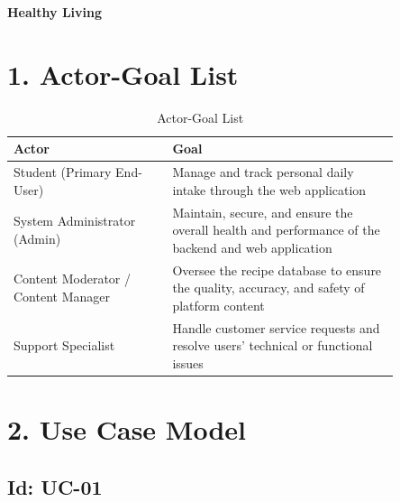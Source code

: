 \documentclass[10pt,letterpaper]{article}
\newcommand{\indexterms}[1]{{\fontsize{9}{11}\selectfont \textbf{Index Terms---} #1\par}}
\begin{document}
\begin{center}
{\fontsize{24}{28}\selectfont \textbf{Healthy Living}}
\end{center}
\vspace{0.5em}


\section*{1. Actor-Goal List}

\begin{table}[h!]
\centering
\caption{Actor-Goal List}
\label{tab:actor-goal-list}
\begin{tabular}{|p{0.35\linewidth}|p{0.5\linewidth}|}
\hline
\textbf{Actor} & \textbf{Goal} \\
\hline
Student (Primary End-User) & Manage and track personal daily intake through the web application \\
\hline
System Administrator (Admin) & Maintain, secure, and ensure the overall health and performance of the backend and web application \\
\hline
Content Moderator / Content Manager & Oversee the recipe database to ensure the quality, accuracy, and safety of platform content \\
\hline
Support Specialist & Handle customer service requests and resolve users' technical or functional issues \\
\hline
\end{tabular}
\end{table}

\section*{2. Use Case Model}

\subsection*{Id: UC-01}
\end{document}
